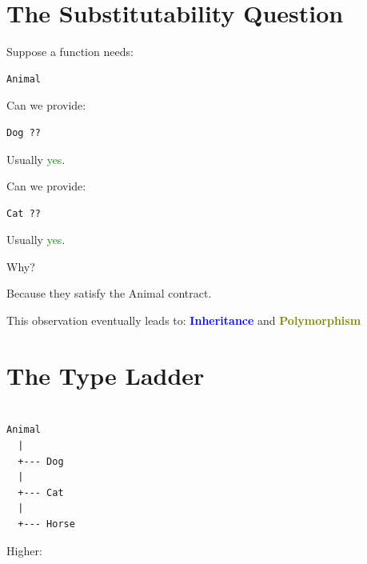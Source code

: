\documentclass[11pt,a4paper]{book}
\begin{document}

\section{The Substitutability Question}

Suppose a function needs:

\begin{verbatim}
Animal
\end{verbatim}


Can we provide:

\begin{verbatim}
Dog ??
\end{verbatim}

Usually \textcolor{green}{yes}.


Can we provide:

\begin{verbatim}
Cat ??
\end{verbatim}

Usually \textcolor{green}{yes}.


Why?

Because they satisfy the \textcolor{RosettaDeepGreen}{Animal} contract.


This observation eventually leads to:   \textcolor{blue}{\textbf{Inheritance}} and \textcolor{olive}{\textbf{Polymorphism}}
\newpage

\section{The Type Ladder}

\begin{verbatim}

Animal
  |
  +--- Dog
  |
  +--- Cat
  |
  +--- Horse

\end{verbatim}


Higher:
\end{document}
